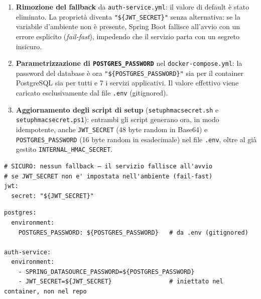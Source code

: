 ﻿\documentclass[a4paper,12pt]{report}
\begin{document}
\begin{enumerate}
  \item \textbf{Rimozione del fallback} da \texttt{auth-service.yml}: il valore di default
        è stato eliminato. La proprietà diventa \texttt{"\$\{JWT\_SECRET\}"} senza alternativa:
        se la variabile d'ambiente non è presente, Spring Boot fallisce all'avvio con un errore
        esplicito (\emph{fail-fast}), impedendo che il servizio parta con un segreto insicuro.

  \item \textbf{Parametrizzazione di \texttt{POSTGRES\_PASSWORD}} nel \texttt{docker-compose.yml}:
        la password del database è ora \texttt{"\$\{POSTGRES\_PASSWORD\}"} sia per il container
        PostgreSQL sia per tutti e 7 i servizi applicativi. Il valore effettivo viene caricato
        esclusivamente dal file \texttt{.env} (gitignored).

  \item \textbf{Aggiornamento degli script di setup}
        (\texttt{setup\-hmac\-secret.sh} e \texttt{setup\-hmac\-secret.ps1}):
        entrambi gli script generano ora, in modo idempotente,
        anche \texttt{JWT\_SECRET} (48 byte random in Base64)
        e \texttt{POSTGRES\_PASSWORD} (16 byte random in esadecimale)
        nel file \texttt{.env}, oltre al già gestito
        \texttt{INTERNAL\_HMAC\_SECRET}.
\end{enumerate}

\begin{securebox}[title={Configurazione Sicura --- auth-service.yml (feature/secure-coding-hardening)}]
\begin{lstlisting}[style=yaml]
# SICURO: nessun fallback — il servizio fallisce all'avvio
# se JWT_SECRET non e' impostata nell'ambiente (fail-fast)
jwt:
  secret: "${JWT_SECRET}"
\end{lstlisting}
\end{securebox}

\begin{securebox}[title={docker-compose.yml (post-hardening) --- segreti da variabili d'ambiente}]
\begin{lstlisting}[style=yaml]
postgres:
  environment:
    POSTGRES_PASSWORD: ${POSTGRES_PASSWORD}   # da .env (gitignored)

auth-service:
  environment:
    - SPRING_DATASOURCE_PASSWORD=${POSTGRES_PASSWORD}
    - JWT_SECRET=${JWT_SECRET}                # iniettato nel container, non nel repo
\end{lstlisting}
\end{securebox}
\end{document}

